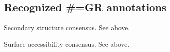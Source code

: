 \subsection{Recognized #=GR annotations}

\begin{wideitem}
\item [\emprog{SS}]
	Secondary structure consensus. See  above.
\item [\emprog{SA}]
	Surface accessibility consensus. See  above.
\end{wideitem}


